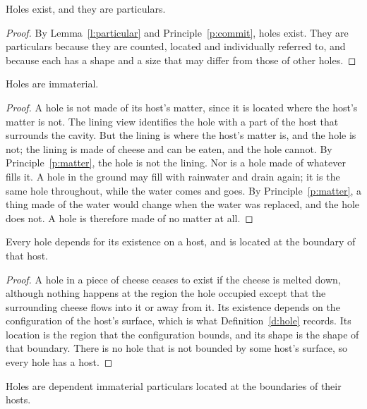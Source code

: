 \documentclass{situationist-preprint}
\begin{document}
\begin{theorem}\label{t:exist}
Holes exist, and they are particulars.
\end{theorem}

\begin{proof}
By Lemma~\ref{l:particular} and Principle~\ref{p:commit}, holes exist. They are particulars because they are counted, located and individually referred to, and because each has a shape and a size that may differ from those of other holes.
\end{proof}

\begin{proposition}\label{p:immaterial}
Holes are immaterial.
\end{proposition}

\begin{proof}
A hole is not made of its host's matter, since it is located where the host's matter is not. The lining view identifies the hole with a part of the host that surrounds the cavity. But the lining is where the host's matter is, and the hole is not; the lining is made of cheese and can be eaten, and the hole cannot. By Principle~\ref{p:matter}, the hole is not the lining. Nor is a hole made of whatever fills it. A hole in the ground may fill with rainwater and drain again; it is the same hole throughout, while the water comes and goes. By Principle~\ref{p:matter}, a thing made of the water would change when the water was replaced, and the hole does not. A hole is therefore made of no matter at all.
\end{proof}

\begin{proposition}\label{p:dependent}
Every hole depends for its existence on a host, and is located at the boundary of that host.
\end{proposition}

\begin{proof}
A hole in a piece of cheese ceases to exist if the cheese is melted down, although nothing happens at the region the hole occupied except that the surrounding cheese flows into it or away from it. Its existence depends on the configuration of the host's surface, which is what Definition~\ref{d:hole} records. Its location is the region that the configuration bounds, and its shape is the shape of that boundary. There is no hole that is not bounded by some host's surface, so every hole has a host.
\end{proof}

\begin{corollary}\label{c:main}
Holes are dependent immaterial particulars located at the boundaries of their hosts.
\end{corollary}
\end{document}
